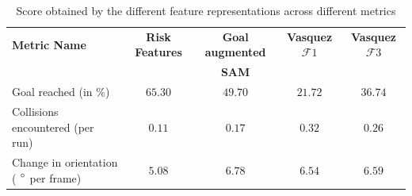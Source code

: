 \begin{table}[htbp]
	\begin{center}
		\renewcommand{\arraystretch}{1.5}
		\begin{tabular}{|p{2.5cm}|c|c|c|c|}
			\hline
			\textbf{Metric Name} & \textbf{Risk Features} & \textbf{Goal augmented}  & \textbf{Vasquez $\mathcal{F}1$} & \textbf{Vasquez $\mathcal{F}3$}\\
			  &   & \textbf{SAM}  &  &  \\
			\hline
			Goal reached (in $\%$) & $65.30$ & $49.70$ & $21.72$ & $36.74$ \\
			Collisions encountered (per run) & $0.11$ & $0.17$ & $0.32$ & $0.26$\\
			Change in orientation ( $\degree$ per frame)  & $5.08$ & $6.78$ &  $6.54$ & $ 6.59$\\ %
			\hline
		\end{tabular}
	\end{center}
	\caption{Score obtained by the different feature representations across different metrics}
	\label{tab:inter_irl_numerical_comparison}
\end{table}\\

